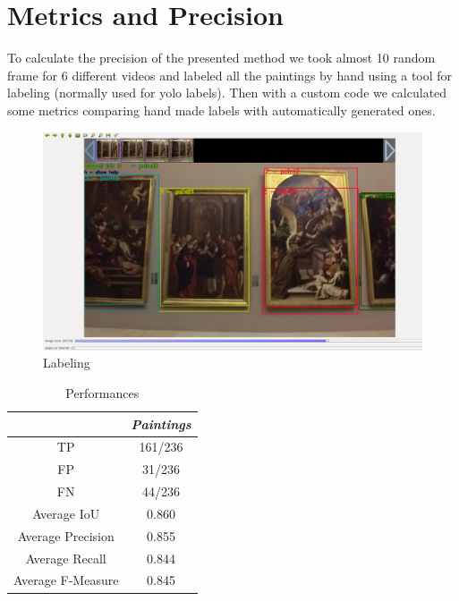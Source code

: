 \documentclass[conference]{IEEEtran}
\begin{document}
\section{Metrics and Precision}
To calculate the precision of the presented method we took almost 10 random frame for 6 different videos and labeled all the paintings by hand using a tool for labeling (normally used for yolo labels). Then with a custom code we calculated some metrics comparing hand made labels with automatically generated ones.

\begin{figure}[htbp]
\centerline{\includegraphics[width=0.8\columnwidth]{../Labeling_precision_metrics/Precision_Labeling.png}}
\caption{Labeling}
\label{fig_labeling}
\end{figure}

\begin{table}[htbp]
\caption{Performances}
\begin{center}
\begin{tabular}{|c|c|}
\hline
\textbf{} & \textbf{\textit{Paintings}} \\
\hline
TP& 161/236\\
\hline
FP& 31/236\\
\hline
FN& 44/236\\
\hline
Average IoU& 0.860\\
\hline
Average Precision& 0.855\\
\hline
Average Recall& 0.844\\
\hline
Average F-Measure& 0.845\\
\hline
\end{tabular}
\label{tab1}
\end{center}
\end{table}
\end{document}
